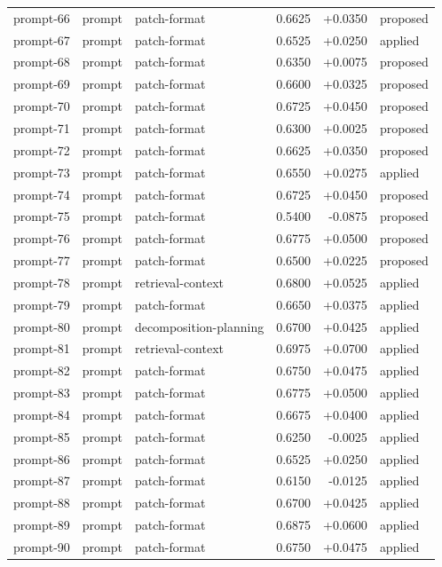 \begin{center}
\begin{longtable}{llp{5.2cm}rrl}
prompt-66 & prompt & patch-format & 0.6625 & +0.0350 & proposed \\
prompt-67 & prompt & patch-format & 0.6525 & +0.0250 & applied \\
prompt-68 & prompt & patch-format & 0.6350 & +0.0075 & proposed \\
prompt-69 & prompt & patch-format & 0.6600 & +0.0325 & proposed \\
prompt-70 & prompt & patch-format & 0.6725 & +0.0450 & proposed \\
prompt-71 & prompt & patch-format & 0.6300 & +0.0025 & proposed \\
prompt-72 & prompt & patch-format & 0.6625 & +0.0350 & proposed \\
prompt-73 & prompt & patch-format & 0.6550 & +0.0275 & applied \\
prompt-74 & prompt & patch-format & 0.6725 & +0.0450 & proposed \\
prompt-75 & prompt & patch-format & 0.5400 & -0.0875 & proposed \\
prompt-76 & prompt & patch-format & 0.6775 & +0.0500 & proposed \\
prompt-77 & prompt & patch-format & 0.6500 & +0.0225 & proposed \\
prompt-78 & prompt & retrieval-context & 0.6800 & +0.0525 & applied \\
prompt-79 & prompt & patch-format & 0.6650 & +0.0375 & applied \\
prompt-80 & prompt & decomposition-planning & 0.6700 & +0.0425 & applied \\
prompt-81 & prompt & retrieval-context & 0.6975 & +0.0700 & applied \\
prompt-82 & prompt & patch-format & 0.6750 & +0.0475 & applied \\
prompt-83 & prompt & patch-format & 0.6775 & +0.0500 & applied \\
prompt-84 & prompt & patch-format & 0.6675 & +0.0400 & applied \\
prompt-85 & prompt & patch-format & 0.6250 & -0.0025 & applied \\
prompt-86 & prompt & patch-format & 0.6525 & +0.0250 & applied \\
prompt-87 & prompt & patch-format & 0.6150 & -0.0125 & applied \\
prompt-88 & prompt & patch-format & 0.6700 & +0.0425 & applied \\
prompt-89 & prompt & patch-format & 0.6875 & +0.0600 & applied \\
prompt-90 & prompt & patch-format & 0.6750 & +0.0475 & applied \\

\end{longtable}
\end{center}
